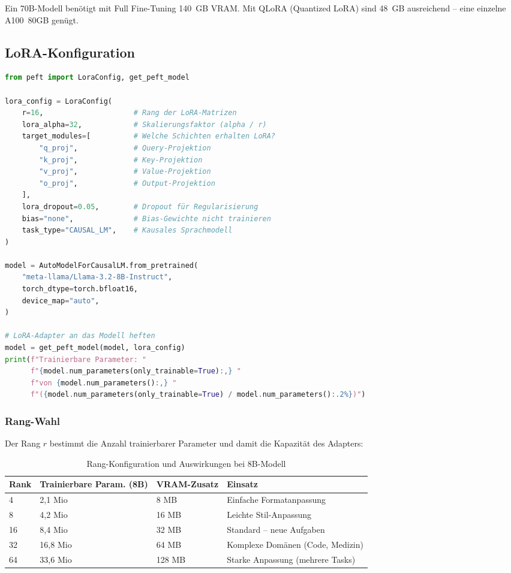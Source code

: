 Ein 70B-Modell benötigt mit Full Fine-Tuning 140~GB VRAM. Mit QLoRA (Quantized LoRA) sind 48~GB ausreichend -- eine einzelne A100~80GB genügt.

\subsection{LoRA-Konfiguration}

\begin{lstlisting}[language=Python, caption=LoRA-Konfiguration mit Hugging Face PEFT]
from peft import LoraConfig, get_peft_model

lora_config = LoraConfig(
    r=16,                     # Rang der LoRA-Matrizen
    lora_alpha=32,            # Skalierungsfaktor (alpha / r)
    target_modules=[          # Welche Schichten erhalten LoRA?
        "q_proj",             # Query-Projektion
        "k_proj",             # Key-Projektion
        "v_proj",             # Value-Projektion
        "o_proj",             # Output-Projektion
    ],
    lora_dropout=0.05,        # Dropout für Regularisierung
    bias="none",              # Bias-Gewichte nicht trainieren
    task_type="CAUSAL_LM",    # Kausales Sprachmodell
)

model = AutoModelForCausalLM.from_pretrained(
    "meta-llama/Llama-3.2-8B-Instruct",
    torch_dtype=torch.bfloat16,
    device_map="auto",
)

# LoRA-Adapter an das Modell heften
model = get_peft_model(model, lora_config)
print(f"Trainierbare Parameter: "
      f"{model.num_parameters(only_trainable=True):,} "
      f"von {model.num_parameters():,} "
      f"({model.num_parameters(only_trainable=True) / model.num_parameters():.2%})")
\end{lstlisting}

\subsubsection{Rang-Wahl}

Der Rang $r$ bestimmt die Anzahl trainierbarer Parameter und damit die Kapazität des Adapters:

\begin{table}[H]
\centering
\begin{tabularx}{\linewidth}{lXXX}
\toprule
\textbf{Rank} & \textbf{Trainierbare Param. (8B)} & \textbf{VRAM-Zusatz} & \textbf{Einsatz} \\
\midrule
4 & 2,1 Mio & 8 MB & Einfache Formatanpassung \\
8 & 4,2 Mio & 16 MB & Leichte Stil-Anpassung \\
16 & 8,4 Mio & 32 MB & Standard -- neue Aufgaben \\
32 & 16,8 Mio & 64 MB & Komplexe Domänen (Code, Medizin) \\
64 & 33,6 Mio & 128 MB & Starke Anpassung (mehrere Tasks) \\
\bottomrule
\end{tabularx}
\caption{Rang-Konfiguration und Auswirkungen bei 8B-Modell}
\protect\label{tab:lora-rank}
\end{table}

